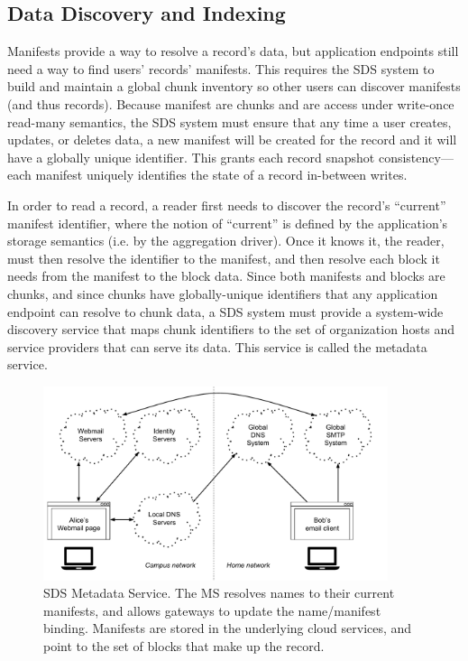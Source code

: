 \subsection{Data Discovery and Indexing}
\label{sec:metadata-service}

Manifests provide a way to resolve a record's data, but application endpoints
still need a way to find users' records' manifests.
This requires the SDS system to build and maintain a global
chunk inventory so other users can discover manifests (and thus records).
Because manifest are chunks and are access under write-once read-many semantics,
the SDS system must ensure that any time a user creates, updates, or deletes
data, a new manifest will be created for the record and it will have a globally unique
identifier.  This grants each record snapshot consistency---each manifest
uniquely identifies the state of a record in-between writes.

In order to read a record, a reader first
needs to discover the record's ``current'' manifest identifier, where the notion
of ``current'' is defined by the application's storage semantics (i.e. by the
aggregation driver).  Once it knows it, the reader, must then resolve the
identifier to the manifest, and then resolve each block it needs from the
manifest to the block data.  Since both manifests and blocks are chunks,
and since chunks have globally-unique identifiers that any application endpoint
can resolve to chunk data, a SDS
system must provide a system-wide discovery service that maps chunk identifiers to the set of
organization hosts and service providers that can serve its data.
This service is called the metadata service.

\begin{figure}[h]
   \centering
   \includegraphics[width=0.9\textwidth,page=5]{figures/dissertation-figures}
   \caption{SDS Metadata Service.  The MS resolves names to their current
   manifests, and allows gateways to update the name/manifest binding.
   Manifests are stored in the underlying cloud services, and
   point to the set of blocks that make up the record.}
   \label{fig:chap2-metadata-service}
\end{figure}

